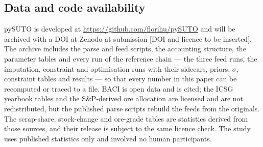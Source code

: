 \subsection{Data and code availability}\label{sec:availability}

pySUTO is developed at \url{https://github.com/florihu/pySUTO} and will be
archived with a DOI at Zenodo at submission [DOI and licence to be
inserted]. The archive includes the parse and feed scripts, the accounting
structure, the parameter tables and every run of the reference chain --- the
three feed runs, the imputation, constraint and optimisation runs with their
sidecars, priors, $\sigma$, constraint tables and results --- so that every
number in this paper can be recomputed or traced to a file. BACI is open
data and is cited; the ICSG yearbook tables and the S\&P-derived ore
allocation are licensed and are not redistributed, but the published parse
scripts rebuild the feeds from the originals. The scrap-share, stock-change
and ore-grade tables are statistics derived from those sources, and their
release is subject to the same licence check. The study uses published
statistics only and involved no human participants.
